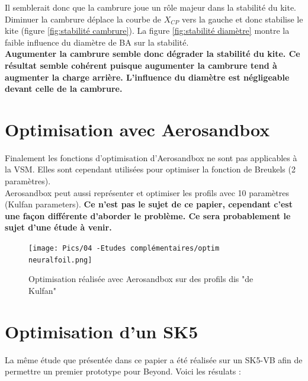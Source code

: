 Il semblerait donc que la cambrure joue un rôle majeur dans la stabilité du kite. Diminuer la cambrure déplace la courbe de $X_{CP}$ vers la gauche et donc stabilise le kite (figure \ref{fig:stabilité cambrure}). La figure \ref{fig:stabilité diamètre} montre la faible influence du diamètre de BA sur la stabilité. \\
\textbf{ Augumenter la cambrure semble donc dégrader la stabilité du kite. Ce résultat semble cohérent puisque augumenter la cambrure tend à augmenter la charge arrière. L'influence du diamètre est négligeable devant celle de la cambrure. }



\section{Optimisation avec Aerosandbox}
\label{sec:Ch4.3}

Finalement les fonctions d'optimisation d'Aerosandbox ne sont pas applicables à la VSM. Elles sont cependant utilisées pour optimiser la fonction de Breukels (2 paramètres). \\
Aerosandbox peut aussi représenter et optimiser les profils avec 10 paramètres (Kulfan parameters). \textbf{Ce n'est pas le sujet de ce papier, cependant c'est une façon différente d'aborder le problème. Ce sera probablement le sujet d'une étude à venir.}

\begin{figure}[H]
    \centering
    \texttt{[image: Pics/04 -Etudes complémentaires/optim neuralfoil.png]}  
    \caption{Optimisation réalisée avec Aerosandbox sur des profils dis "de Kulfan"}
    \label{fig:kulfan}
\end{figure}


\section{Optimisation d'un SK5}
\label{sec:Ch4.4}

La même étude que présentée dans ce papier a été réalisée sur un SK5-VB afin de permettre un premier prototype pour Beyond. Voici les résulats :\\

